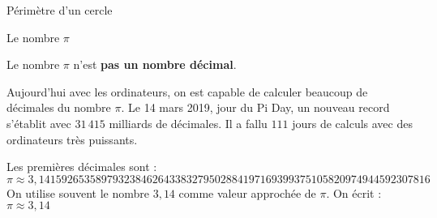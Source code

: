 \begin{pageCours}
\begin{Pp}{Périmètre d'un cercle}
\begin{minipage}{0.28\linewidth}
 
\end{minipage}

\end{Pp}


\begin{DefT}{Le nombre $\pi$}

Le nombre $\pi$\index{$\pi$} n'est \textbf{pas un nombre décimal}.

\end{DefT}

\begin{Rq}
Aujourd'hui avec les ordinateurs, on est capable de calculer beaucoup de décimales du nombre $\pi$. Le 14 mars 2019, jour du Pi Day, un nouveau record s'établit avec \textcolor{sacado_green}{$31\,415$ milliards} de décimales. Il a fallu $111$ jours de calculs avec des ordinateurs très puissants.

Les premières décimales sont :
\[\pi \approx 3,1415926535 8979323846 2643383279 5028841971 6939937510 5820974944
592307816\]
On utilise souvent le nombre $3,14$ comme valeur approchée de $\pi$. On écrit : $\pi \approx 3,14$
\end{Rq}






\end{pageCours}
